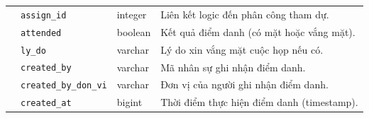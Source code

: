 \begin{xltabular}{\textwidth}{|L{2.7cm}|L{2.6cm}|L{4.2cm}|Y|}
 & \texttt{assign\_id} & integer & Liên kết logic đến phân công tham dự. \\
 & \texttt{attended} & boolean & Kết quả điểm danh (có mặt hoặc vắng mặt). \\
 & \texttt{ly\_do} & varchar & Lý do xin vắng mặt cuộc họp nếu có. \\
 & \texttt{created\_by} & varchar & Mã nhân sự ghi nhận điểm danh. \\
 & \texttt{created\_by\_}\mbox{\texttt{don\_vi}} & varchar & Đơn vị của người ghi nhận điểm danh. \\
 & \texttt{created\_at} & bigint & Thời điểm thực hiện điểm danh (timestamp). \\
\end{xltabular}
